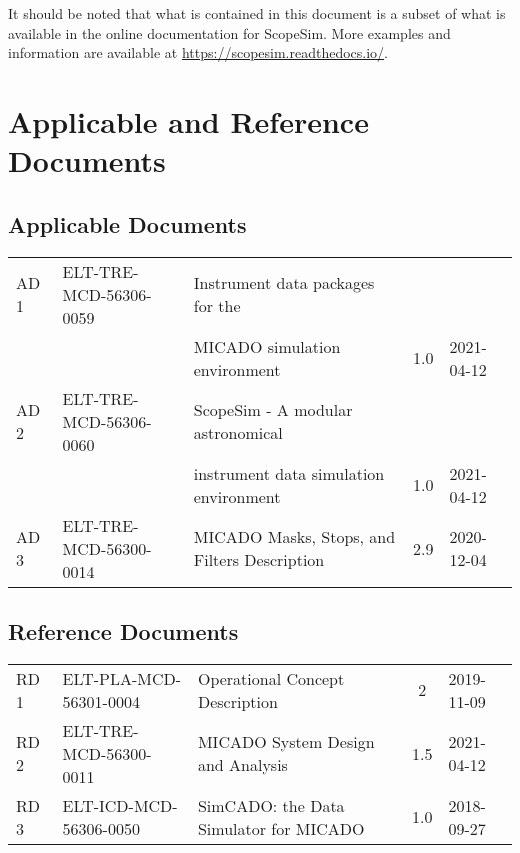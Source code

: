 It should be noted that what is contained in this document is a subset of what is available in the online documentation for ScopeSim.
More examples and information are available at \url{https://scopesim.readthedocs.io/}.


\section{Applicable and Reference Documents}
\label{sec:documents}

\subsection{Applicable Documents}

\begin{center}
  \tabletail{\hline}

  \begin{supertabular}{|l|l|l|c|l|}
    AD\,1 & ELT-TRE-MCD-56306-0059 & Instrument data packages for the & & \\
    & & MICADO simulation environment & 1.0 & 2021-04-12 \\
    AD\,2 & ELT-TRE-MCD-56306-0060 & ScopeSim - A modular astronomical & & \\
    & & instrument data simulation environment & 1.0 & 2021-04-12 \\
    AD\,3 & ELT-TRE-MCD-56300-0014 & MICADO Masks, Stops, and Filters Description & 2.9 & 2020-12-04 \\
  \end{supertabular}
\end{center}

\subsection{Reference Documents}

\begin{center}
  \tabletail{\hline}

  \begin{supertabular}{|l|l|l|c|l|}
    \hline
    RD\,1 & ELT-PLA-MCD-56301-0004 & Operational Concept Description &
    2 & 2019-11-09 \\
    RD\,2 & ELT-TRE-MCD-56300-0011 & MICADO System Design and Analysis & 1.5 &
    2021-04-12 \\
    RD\,3 & ELT-ICD-MCD-56306-0050 & SimCADO: the Data Simulator for MICADO & 1.0 & 2018-09-27 \\

  \end{supertabular}
\end{center}